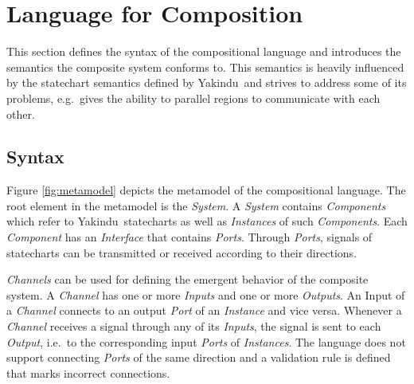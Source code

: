 \documentclass[conference]{IEEEtran}
\newcommand{\Yakindu}{\textsf{Yakindu}}
\begin{document}
\section{Language for Composition}
\label{sec:compositional_language}

This section defines the syntax of the compositional language and introduces the semantics the composite system conforms to. This semantics is heavily influenced by the statechart semantics defined by \Yakindu\ and strives to address some of its problems, e.g.~gives the ability to parallel regions to communicate with each other. 

\subsection{Syntax}

Figure \ref{fig:metamodel} depicts the metamodel of the compositional language. The root element in the metamodel is the \textsl{System}. A \textsl{System} contains \textsl{Components} which refer to \Yakindu\ statecharts as well as \textsl{Instances} of such \textsl{Components}. Each \textsl{Component} has an \textsl{Interface} that contains \textsl{Ports}. Through \textsl{Ports}, signals of statecharts can be transmitted or received according to their directions.

\textsl{Channels} can be used for defining the emergent behavior of the composite system. A \textsl{Channel} has one or more \textsl{Inputs} and one or more \textsl{Outputs}. An Input of a \textsl{Channel} connects to an output \textsl{Port} of an \textsl{Instance} and vice versa. Whenever a \textsl{Channel} receives a signal through any of its \textsl{Inputs}, the signal is sent to each \textsl{Output}, i.e.~to the corresponding input \textsl{Ports} of \textsl{Instances}. The language does not support connecting \textsl{Ports} of the same direction and a validation rule is defined that marks incorrect connections.
\end{document}
